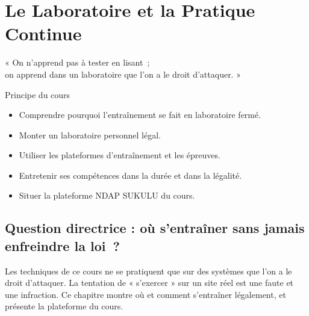 
\chapter{Le Laboratoire et la Pratique Continue}
\label{chap:labo}

\epigraph{%
    « On n'apprend pas à tester en lisant~;\\
    on apprend dans un laboratoire que l'on a le droit d'attaquer. »%
}{Principe du cours}


\begin{boxobjectifs}
\begin{itemize}
    \item Comprendre pourquoi l'entraînement se fait en laboratoire fermé.
    \item Monter un laboratoire personnel légal.
    \item Utiliser les plateformes d'entraînement et les épreuves.
    \item Entretenir ses compétences dans la durée et dans la légalité.
    \item Situer la plateforme NDAP SUKULU du cours.
\end{itemize}
\end{boxobjectifs}

\bigskip

\section*{Question directrice : où s'entraîner sans jamais enfreindre la loi~?}

Les techniques de ce cours ne se pratiquent que sur des systèmes que l'on a
le droit d'attaquer. La tentation de « s'exercer » sur un site réel est une
faute et une infraction. Ce chapitre montre où et comment s'entraîner
légalement, et présente la plateforme du cours.

